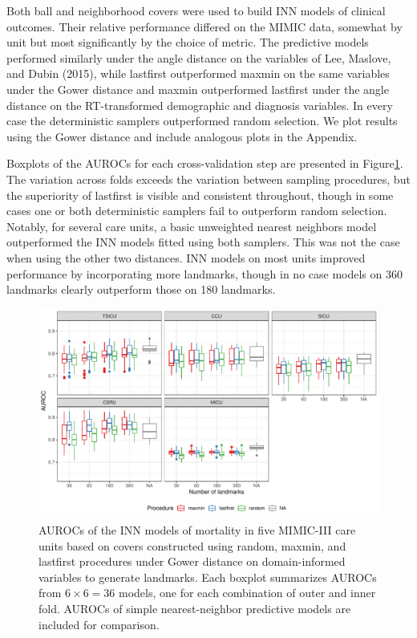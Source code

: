 \documentclass{article}
\begin{document}
Both ball and neighborhood covers were used to build INN models of
clinical outcomes. Their relative performance differed on the MIMIC
data, somewhat by unit but most significantly by the choice of metric.
The predictive models performed similarly under the angle distance on
the variables of Lee, Maslove, and Dubin (2015), while lastfirst
outperformed maxmin on the same variables under the Gower distance and
maxmin outperformed lastfirst under the angle distance on the
RT-transformed demographic and diagnosis variables. In every case the
deterministic samplers outperformed random selection. We plot results
using the Gower distance and include analogous plots in the Appendix.

Boxplots of the AUROCs for each cross-validation step are presented in
Figure\nbs\ref{fig:knn-mimic-gower}. The variation across folds exceeds
the variation between sampling procedures, but the superiority of
lastfirst is visible and consistent throughout, though in some cases one
or both deterministic samplers fail to outperform random selection.
Notably, for several care units, a basic unweighted nearest neighbors
model outperformed the INN models fitted using both samplers. This was
not the case when using the other two distances. INN models on most
units improved performance by incorporating more landmarks, though in no
case models on 360 landmarks clearly outperform those on 180 landmarks.

\begin{figure}
\includegraphics[width=\textwidth]{../figures/knn-gower-auc-2}
\caption{
AUROCs of the INN models of mortality in five MIMIC-III care units based on covers constructed using random, maxmin, and lastfirst procedures under Gower distance on domain-informed variables to generate landmarks.
Each boxplot summarizes AUROCs from $6 \times 6 = 36$ models, one for each combination of outer and inner fold.
AUROCs of simple nearest-neighbor predictive models are included for comparison.
\label{fig:knn-mimic-gower}
}
\end{figure}
\end{document}
